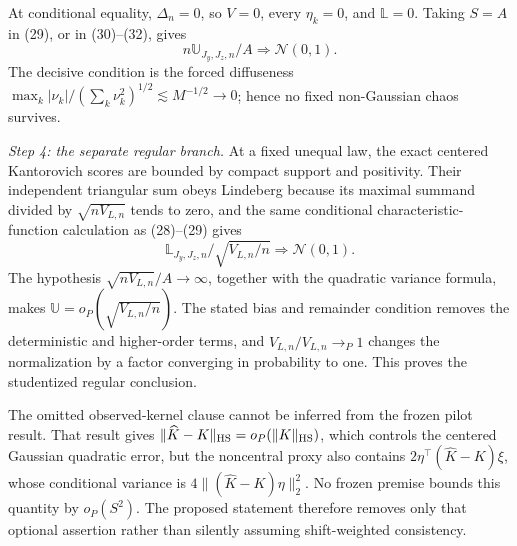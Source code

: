 At conditional equality, \(\Delta_n=0\), so \(V=0\), every \(\eta_k=0\), and \(\mathbb L=0\).  Taking \(S=A\) in (29), or in (30)--(32), gives
\[
n\mathbb U_{J_y,J_z,n}/A\Rightarrow\mathcal N(0,1).
\]
The decisive condition is the forced diffuseness \(\max_k|\nu_k|/(\sum_k\nu_k^2)^{1/2}\lesssim M^{-1/2}\to0\); hence no fixed non-Gaussian chaos survives.

\emph{Step 4: the separate regular branch.}
At a fixed unequal law, the exact centered Kantorovich scores are bounded by compact support and positivity.  Their independent triangular sum obeys Lindeberg because its maximal summand divided by \(\sqrt{nV_{L,n}}\) tends to zero, and the same conditional characteristic-function calculation as (28)--(29) gives
\[
\mathbb L_{J_y,J_z,n}/\sqrt{V_{L,n}/n}\Rightarrow\mathcal N(0,1).
\]
The hypothesis \(\sqrt{nV_{L,n}}/A\to\infty\), together with the quadratic variance formula, makes \(\mathbb U=o_P(\sqrt{V_{L,n}/n})\).  The stated bias and remainder condition removes the deterministic and higher-order terms, and \(\widehat V_{L,n}/V_{L,n}\to_P1\) changes the normalization by a factor converging in probability to one.  This proves the studentized regular conclusion.

The omitted observed-kernel clause cannot be inferred from the frozen pilot result.  That result gives \(\|\widehat K-K\|_{\rm HS}=o_P(\|K\|_{\rm HS})\), which controls the centered Gaussian quadratic error, but the noncentral proxy also contains \(2\eta^\top(\widehat K-K)\xi\), whose conditional variance is \(4\|(\widehat K-K)\eta\|_2^2\).  No frozen premise bounds this quantity by \(o_P(S^2)\).  The proposed statement therefore removes only that optional assertion rather than silently assuming shift-weighted consistency.